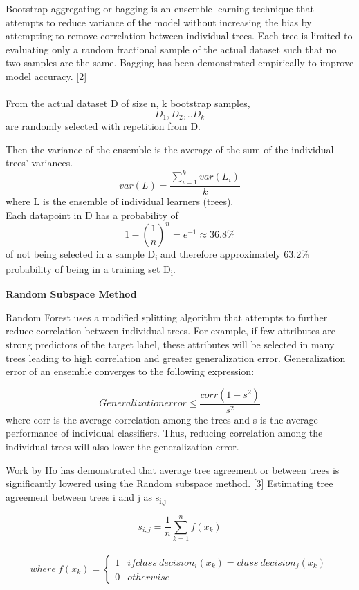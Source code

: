 \documentclass{article} %
\begin{document}
Bootstrap aggregating or bagging is an ensemble learning technique that attempts to reduce variance of the model without increasing the bias by attempting to remove correlation between individual trees. Each tree is limited to evaluating only a random fractional sample of the actual dataset such that no two samples are the same. Bagging has been demonstrated empirically to improve model accuracy. [2]\\\\
From the actual dataset D of size n, k bootstrap samples, \[ D_1,D_2,..D_k  \] are randomly selected with repetition from D. 

Then the variance of the ensemble is the average of the sum of the individual trees' variances.
\[ var(L) = \frac{\sum_{i=1}^k var(L_i)}{k}\] where L is the ensemble of individual learners (trees).\\

Each datapoint in D has a probability of \[1-(\frac{1}{n})^n = e^{-1} \approx 36.8 \% \] of not being selected in  a sample D\textsubscript{i} and therefore approximately 63.2\% probability of being in a training set D\textsubscript{i}.

\textbf{Random Subspace Method}

Random Forest uses a modified splitting algorithm that attempts to further reduce correlation between individual trees. For example, if few attributes are strong predictors of the target label, these attributes will be selected in many trees leading to high correlation and greater generalization error.  Generalization error of an ensemble converges to the following expression:

\[Generalization error \leq \frac{corr(1-s^2)}{s^2}\] where corr is the average correlation among the trees and s is the average performance of individual classifiers. Thus, reducing correlation among the individual trees will also lower the generalization error.

 Work by Ho has demonstrated that average tree agreement or between trees is significantly lowered using the Random subspace method. [3] 
Estimating tree agreement between trees i and j as s\textsubscript{i,j}

\[ s_{i,j} = \frac{1}{n}\sum_{k=1}^{n}f(x_k)\]
\
\[ where \ f(x_k) = \begin{cases} 
      1 & if class\ decision_i(x_k) = class \ decision_j(x_k) \\
      0 & otherwise
   \end{cases}
\]
\end{document}
